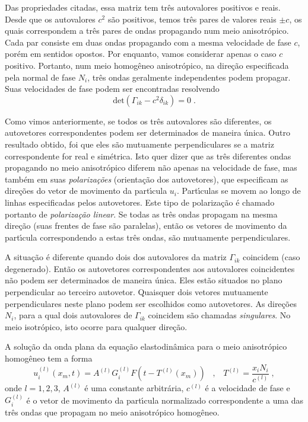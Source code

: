 Das propriedades citadas, essa matriz tem tr\^es autovalores
positivos e reais. Desde que os autovalores $c^2$ s\~ao positivos,
temos tr\^es pares de valores reais $\pm c$, os quais correspondem
a tr\^es pares de ondas propagando num meio anisotr\'opico. Cada
par consiste em duas ondas propagando com a mesma velocidade de
fase $c$, por\'em em sentidos opostos. Por enquanto, vamos
considerar apenas o caso $c$ positivo. Portanto, num meio
homog\^eneo anisotr\'opico, na dire\c{c}\~ao especificada pela
normal de fase $N_i$, tr\^es ondas geralmente independentes podem
propagar. Suas velocidades de fase podem ser encontradas
resolvendo
\begin{equation}
\mathrm{det}(\Gamma_{ik}-c^2\delta_{ik})=0 \;.
\end{equation}

Como vimos anteriormente, se todos os tr\^es autovalores s\~ao
diferentes, os autovetores correspondentes podem ser determinados
de maneira \'unica. Outro resultado obtido, foi que eles s\~ao
mutuamente perpendiculares se a matriz correspondente for real e
sim\'etrica. Isto quer dizer que as tr\^es diferentes ondas
propagando no meio anisotr\'opico diferem n\~ao apenas na
velocidade de fase, mas tamb\'em em suas {\it polariza\c{c}\~oes}
(orienta\c{c}\~ao dos autovetores), que especificam as
dire\c{c}\~oes do vetor de movimento da part\'{\i}cula $u_i$.
Part\'{\i}culas se movem ao longo de linhas especificadas pelos
autovetores. Este tipo de polariza\c{c}\~ao \'e chamado portanto
de {\it polariza\c{c}\~ao linear}. Se todas as tr\^es ondas
propagam na mesma dire\c{c}\~ao (suas frentes de fase s\~ao
paralelas), ent\~ao os vetores de movimento da part\'{\i}cula
correspondendo a estas tr\^es ondas, s\~ao mutuamente
perpendiculares.

A situa\c{c}\~ao \'e diferente quando dois dos autovalores da
matriz $\Gamma_{ik}$ coincidem (caso degenerado). Ent\~ao os
autovetores correspondentes aos autovalores coincidentes n\~ao
podem ser determinados de maneira \'unica. Eles est\~ao situados
no plano perpendicular ao terceiro autovetor. Quaisquer dois
vetores mutuamente perpendiculares neste plano podem ser
escolhidos como autovetores. As dire\c{c}\~oes $N_i$, para a qual
dois autovalores de $\Gamma_{ik}$ coincidem s\~ao chamadas {\it
singulares}. No meio isotr\'opico, isto ocorre para qualquer
dire\c{c}\~ao.

A solu\c{c}\~ao da onda plana da equa\c{c}\~ao elastodin\^amica
para o meio anisotr\'opico homog\^eneo tem a forma
\begin{equation}
u_i^{(l)}(x_m,t)=A^{(l)}G_i^{(l)}F(t-T^{(l)}(x_m)) \;\;\;,\;\;\;
T^{(l)}=\frac{x_i N_i}{c^{(l)}} \;,
\end{equation}
onde $l=1,2,3$, $A^{(l)}$ \'e uma constante arbitr\'aria,
$c^{(l)}$ \'e a velocidade de fase e $G_i^{(l)}$ \'e o vetor de
movimento da part\'{\i}cula normalizado correspondente a uma das
tr\^es ondas que propagam no meio anisotr\'opico homog\^eneo.

